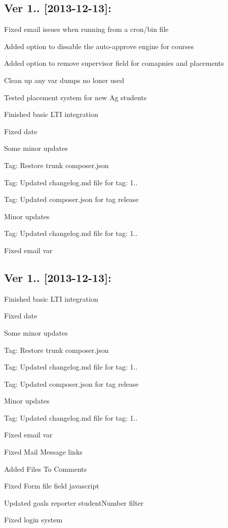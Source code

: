 \subsection*{Ver 1.. \mbox{[}2013-\/12-\/13\mbox{]}\+: }


\begin{DoxyItemize}
\item Fixed email issues when running from a cron/bin file
\item Added option to dissable the auto-\/approve engine for courses
\item Added option to remove supervisor field for comapnies and placements
\item Clean up any var dumps no loner used
\item Tested placement system for new Ag students
\item Finished basic L\+T\+I integration
\item Fixed date
\item Some minor updates
\item Tag\+: Restore trunk composer.\+json
\item Tag\+: Updated changelog.\+md file for tag\+: 1..
\item Tag\+: Updated composer.\+json for tag release
\item Minor updates
\item Tag\+: Updated changelog.\+md file for tag\+: 1..
\item Fixed email var
\end{DoxyItemize}

\subsection*{Ver 1.. \mbox{[}2013-\/12-\/13\mbox{]}\+: }


\begin{DoxyItemize}
\item Finished basic L\+T\+I integration
\item Fixed date
\item Some minor updates
\item Tag\+: Restore trunk composer.\+json
\item Tag\+: Updated changelog.\+md file for tag\+: 1..
\item Tag\+: Updated composer.\+json for tag release
\item Minor updates
\item Tag\+: Updated changelog.\+md file for tag\+: 1..
\item Fixed email var
\item Fixed Mail Message links
\item Added Files To Comments
\item Fixed Form file field javascript
\item Updated goals reporter student\+Number filter
\item Fixed login system
\end{DoxyItemize}


